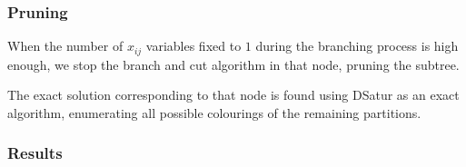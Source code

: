 \documentclass{beamer}
\begin{document}
\begin{frame}
\frametitle{Pruning}

When the number of $x_{ij}$ variables fixed to $1$ during the branching process is high enough, we stop the branch and cut algorithm in that node, pruning the subtree.

The exact solution corresponding to that node is found using DSatur as an exact algorithm, enumerating all possible colourings of the remaining partitions.

\end{frame}

\begin{frame}
\frametitle{Results}


\end{frame} 
\end{document}
